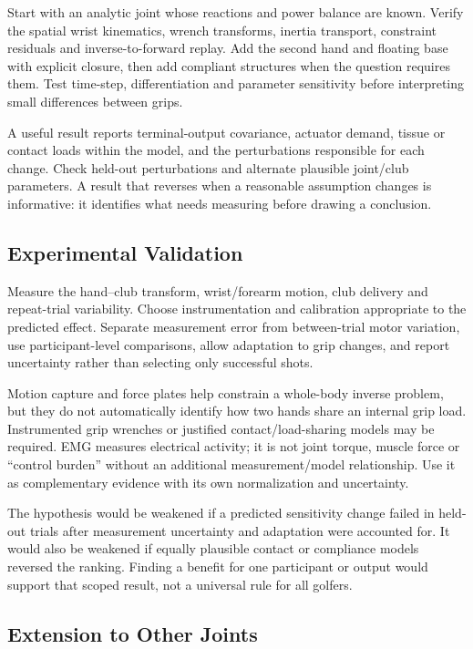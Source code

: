 \documentclass[
  11pt,
]{article}
\begin{document}
Start with an analytic joint whose reactions and power balance are
known. Verify the spatial wrist kinematics, wrench transforms, inertia
transport, constraint residuals and inverse-to-forward replay. Add the
second hand and floating base with explicit closure, then add compliant
structures when the question requires them. Test time-step,
differentiation and parameter sensitivity before interpreting small
differences between grips.

A useful result reports terminal-output covariance, actuator demand,
tissue or contact loads within the model, and the perturbations
responsible for each change. Check held-out perturbations and alternate
plausible joint/club parameters. A result that reverses when a
reasonable assumption changes is informative: it identifies what needs
measuring before drawing a conclusion.

\subsection{Experimental Validation}\label{experimental-validation}

Measure the hand--club transform, wrist/forearm motion, club delivery
and repeat-trial variability. Choose instrumentation and calibration
appropriate to the predicted effect. Separate measurement error from
between-trial motor variation, use participant-level comparisons, allow
adaptation to grip changes, and report uncertainty rather than selecting
only successful shots.

Motion capture and force plates help constrain a whole-body inverse
problem, but they do not automatically identify how two hands share an
internal grip load. Instrumented grip wrenches or justified
contact/load-sharing models may be required. EMG measures electrical
activity; it is not joint torque, muscle force or ``control burden''
without an additional measurement/model relationship. Use it as
complementary evidence with its own normalization and uncertainty.

The hypothesis would be weakened if a predicted sensitivity change
failed in held-out trials after measurement uncertainty and adaptation
were accounted for. It would also be weakened if equally plausible
contact or compliance models reversed the ranking. Finding a benefit for
one participant or output would support that scoped result, not a
universal rule for all golfers.

\subsection{Extension to Other Joints}\label{extension-to-other-joints}
\end{document}

